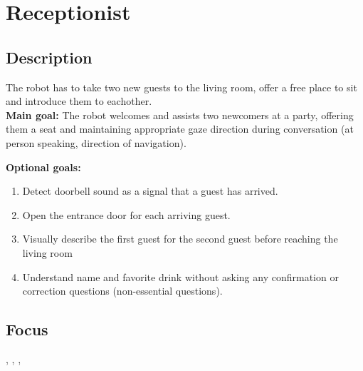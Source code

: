 \section{Receptionist}
\label{test:receptionist}

\subsection*{Description}
The robot has to take two new guests to the living room, offer a free place to sit and introduce them to eachother.\\
    
\textbf{Main goal:}
    The robot welcomes and assists two newcomers at a party, offering them a seat and maintaining appropriate gaze direction during conversation (at person speaking, direction of navigation).

\textbf{Optional goals:}
\begin{enumerate}[nosep]
	\item Detect doorbell sound as a signal that a guest has arrived.
	\item Open the entrance door for each arriving guest.
	\item Visually describe the first guest for the second guest before reaching the living room
	\item Understand name and favorite drink without asking any confirmation or correction questions (non-essential questions).
\end{enumerate}

\subsection*{Focus}
\emph{\SysI{}}, \emph{\HRI{}}, \emph{\PerDet{}}, \emph{\PerRec{}}

